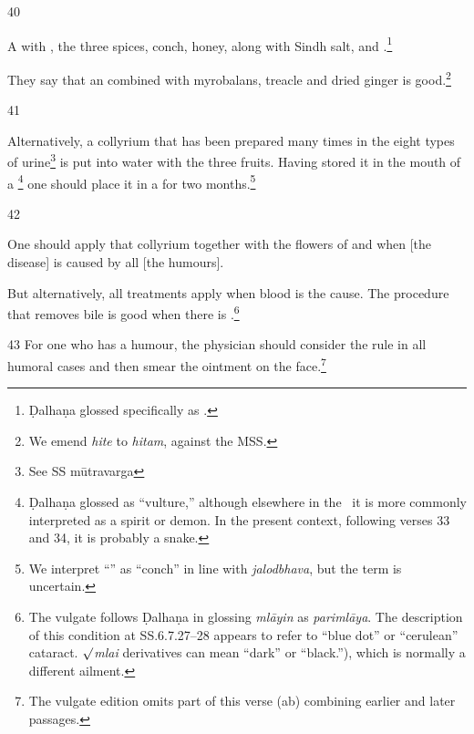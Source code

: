 \begin{translation}
    \item[40] %
    
    A  with 
    , the three spices, conch, honey, along with Sindh salt, 
     and .\footnote{Ḍalhaṇa 
    glossed   specifically as  
    \citep[629]{vulgate}.}
    
    They say that an 
     combined with 
    myrobalans, 
    treacle and 
    dried ginger
    is good.\footnote{We emend \emph{hite} to \emph{hitam}, against the MSS.}
    
    \item[41]
    
    Alternatively, a collyrium that has been prepared many times in the eight types of
    urine\footnote{See SS mūtravarga} is put into water with the three 
    fruits. Having
    stored it in the mouth of a \footnote{Ḍalhaṇa
    glossed  as “vulture,” although elsewhere in the
    \SS\ it is more commonly interpreted as a spirit or demon.  In the present context, 
    following verses 33 and 34, it is probably a snake.} one should place it in a
     for two months.\footnote{We interpret
    “” as “conch” in line with \emph{jalodbhava}, but the
    term is uncertain.}
    
    
    \item[42]
    
    One should apply that collyrium 
    together with the flowers of
    and
    when [the disease] is caused by all [the humours].
    
    But alternatively, all treatments apply when blood is the cause.  The procedure
    that removes bile is good when there is .\footnote{The vulgate follows Ḍalhaṇa in glossing \emph{mlāyin} as
    \emph{parimlāya}.  The description of this condition at SS.6.7.27--28 appears to
    refer to “blue dot” or “cerulean” cataract.  \emph{$\surd$mlai} derivatives can 
    mean “dark” or “black.”), which is normally a different ailment.}
    
    \item[43] For one who has a humour, the physician should consider the rule in
    all humoral cases and then smear the ointment on the face.\footnote{The vulgate
    edition omits part of this verse (ab) combining earlier and later passages.}
    

\end{translation}

